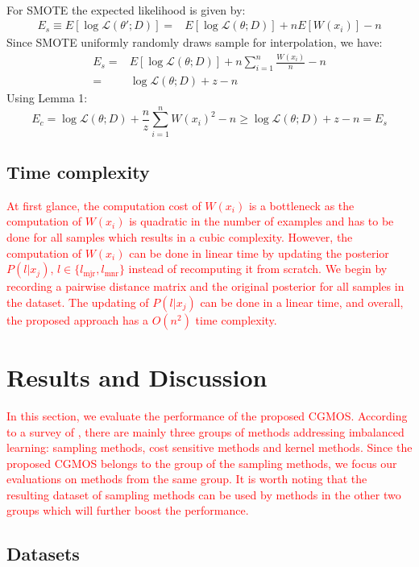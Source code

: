 \documentclass[10pt,journal,compsoc]{IEEEtran}
\begin{document}
{\begin{align}
\end{align}
For SMOTE the expected likelihood is given by:
\begin{align}
E_{s}\equiv E[\log\mathcal{L}(\theta'; D)]=&E[\log\mathcal{L}(\theta; D)] + nE[W(x_i)]-n
\end{align}
Since SMOTE uniformly randomly draws sample for interpolation, we have:
\begin{align}
E_{s}=&E[\log\mathcal{L}(\theta; D)] + n\sum_{i=1}^n \frac{W(x_i)}{n} - n\\
	 =&\log\mathcal{L}(\theta; D) + z - n
\end{align}
Using Lemma 1:
\begin{equation}
E_{c} = \log\mathcal{L}(\theta; D) + \frac{n}{z} \sum_{i=1}^n W(x_i)^2 - n\geq \log\mathcal{L}(\theta; D) + z -n = E_s
\end{equation}}

\subsection{Time complexity}
\textcolor{red}{At first glance, the computation cost of $W(x_i)$ is a bottleneck as the computation of $W(x_i)$ is quadratic in the number of examples and has to be done for all samples which results in a cubic complexity. However, the computation of $W(x_i)$ can be done in linear time by updating the posterior $P(l|x_j)$, $l\in \{l_{\mbox{mjr}}, l_{\mbox{mnr}}\}$ instead of recomputing it from scratch. We begin by recording a pairwise distance matrix and the original posterior for all samples in the dataset. The updating of $P(l|x_j)$ can be done in a linear time, and overall, the proposed approach has a $O(n^2)$ time complexity.} 

\section{Results and Discussion}
\label{sec: results}
\textcolor{red}{In this section, we evaluate the performance of the proposed CGMOS. According to a survey of \cite{HH:09}, there are mainly three groups of methods addressing imbalanced learning: sampling methods, cost sensitive methods and kernel methods. Since the proposed CGMOS belongs to the group of the sampling methods, we focus our evaluations on methods from the same group. It is worth noting that the resulting dataset of sampling methods can be used by methods in the other two groups which will further boost the performance.}

\subsection{Datasets}
\end{document}

